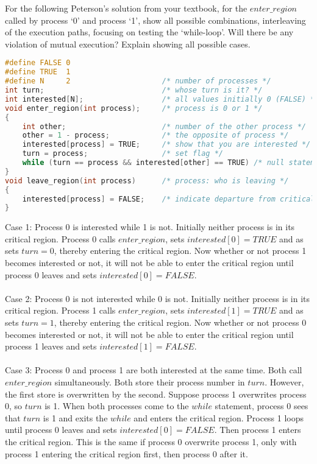 \documentclass[12pt]{article}
\newenvironment{problem}[2][Problem]{\begin{trivlist}
\item[\hskip \labelsep {\bfseries #1}\hskip \labelsep {\bfseries #2.}]}{\end{trivlist}}
\begin{document}
\pagebreak
\begin{problem}{6}
For the following Peterson's solution from your textbook, for the $enter\_region$ called by process
`0' and process `1', show all possible combinations, interleaving of the execution paths, focusing
on testing the `while-loop'. Will there be any violation of mutual execution? Explain showing
all possible cases.
\begin{lstlisting}[language=C, caption=Peterson's solution for achieving mutual exclusion]
#define FALSE 0
#define TRUE  1
#define N     2                     /* number of processes */
int turn;                           /* whose turn is it? */
int interested[N];                  /* all values initially 0 (FALSE) */
void enter_region(int process);     /* process is 0 or 1 */
{
    int other;                      /* number of the other process */
    other = 1 - process;            /* the opposite of process */
    interested[process] = TRUE;     /* show that you are interested */
    turn = process;                 /* set flag */
    while (turn == process && interested[other] == TRUE) /* null statement */ ;
}
void leave_region(int process)      /* process: who is leaving */
{
    interested[process] = FALSE;    /* indicate departure from critical region */
}
\end{lstlisting}
Case 1: Process 0 is interested while 1 is not. Initially neither process is in its critical region.
Process 0 calls $enter\_region$, sets $interested[0] = TRUE$ and as sets $turn = 0$, thereby entering the critical region.
Now whether or not process 1 becomes interested or not, it will not be able to enter the critical region until process 0 leaves and sets $interested[0] = FALSE$.\\\\
Case 2: Process 0 is not interested while 0 is not. Initially neither process is in its critical region.
Process 1 calls $enter\_region$, sets $interested[1] = TRUE$ and as sets $turn = 1$, thereby entering the critical region.
Now whether or not process 0 becomes interested or not, it will not be able to enter the critical region until process 1 leaves and sets $interested[1] = FALSE$.\\\\
Case 3: Process 0 and process 1 are both interested at the same time. Both call $enter\_region$ simultaneously.
Both store their process number in $turn$. However, the first store is overwritten by the second. Suppose process 1 overwrites process 0, so $turn$ is 1.
When both processes come to the $while$ statement, process 0 sees that $turn$ is 1 and exits the $while$ and enters the critical region. Process 1 loops until process 0 leaves and sets $interested[0] = FALSE$.
Then process 1 enters the critical region. This is the same if process 0 overwrite process 1, only with process 1 entering the critical region first, then process 0 after it.
\end{problem}
\end{document}
